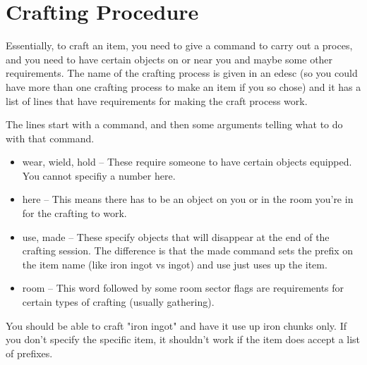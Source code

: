\section{Crafting Procedure}


Essentially, to craft an item, you need to give a command to carry out a
proces, and you need to have certain objects on or near you and maybe some
other requirements. The name of the crafting process is given in an edesc (so
you could have more than one crafting process to make an item if you so chose)
and it has a list of lines that have requirements for making the craft process
work.

The lines start with a command, and then some arguments telling what to do
with that command.

\begin{itemize}

\item wear, wield, hold -- These require someone to have certain objects
  equipped. You cannot specifiy a number here.

\item here -- This means there has to be an object on you or in the room
  you're in for the crafting to work.

\item use, made -- These specify objects that will disappear at the end of the
  crafting session. The difference is that the made command sets the prefix on
  the item name (like iron ingot vs ingot) and use just uses up the item.

\item room -- This word followed by some room sector flags are requirements
  for certain types of crafting (usually gathering).

\end{itemize}

You should be able to craft "iron ingot" and have it use up iron chunks
only. If you don't specify the specific item, it shouldn't work if the item
does accept a list of prefixes.


